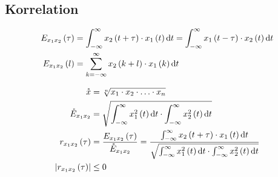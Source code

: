 \subsection{Korrelation}

\begin{boxleft}
\end{boxleft}\begin{boxrightshaded}
\begin{align*}
E_{x_1x_2}\left(\tau\right)&=\int_{-\infty}^\infty x_2\left(t+\tau\right)\cdot x_1\left(t\right)\mathop{}\!\mathrm{d} t=\int_{-\infty}^\infty x_1\left(t-\tau\right)\cdot x_2\left(t\right)\mathop{}\!\mathrm{d} t\\
E_{x_1x_2}\left(l\right)&=\sum_{k=-\infty}^\infty x_2\left(k+l\right)\cdot x_1\left(k\right)\mathop{}\!\mathrm{d} t
\end{align*}
\end{boxrightshaded}

\begin{boxleft}
\end{boxleft}\begin{boxrightshaded}
\begin{align*}
\mathring{x}&=\sqrt[n]{x_1\cdot x_2\cdot \dotsc \cdot x_n}\\
\mathring{E}_{x_1x_2}&=\sqrt{\int_{-\infty}^\infty x_1^2\left(t\right)\mathop{}\!\mathrm{d} t\cdot \int_{-\infty}^\infty x_2^2\left(t\right)\mathop{}\!\mathrm{d} t}\\
r_{x_1x_2}\left(\tau\right)&=\frac{E_{x_1x_2}\left(\tau\right)}{\mathring{E}_{x_1x_2}}=\frac{\int_{-\infty}^\infty x_2\left(t+\tau\right)\cdot x_1\left(t\right)\mathop{}\!\mathrm{d} t}{\sqrt{\int_{-\infty}^\infty x_1^2\left(t\right)\mathop{}\!\mathrm{d} t\cdot \int_{-\infty}^\infty x_2^2\left(t\right)\mathop{}\!\mathrm{d} t}}\\
\left|r_{x_1x_2}\left(\tau\right)\right|&\leq 0
\end{align*}
\end{boxrightshaded}

